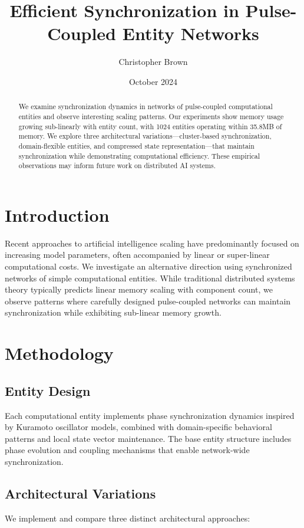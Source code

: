 \documentclass[12pt]{article}
\title{Efficient Synchronization in Pulse-Coupled Entity Networks}
\author{Christopher Brown}
\date{October 2024}
\begin{document}
\maketitle

\begin{abstract}
We examine synchronization dynamics in networks of pulse-coupled computational entities and observe interesting scaling patterns. Our experiments show memory usage growing sub-linearly with entity count, with 1024 entities operating within 35.8MB of memory. We explore three architectural variations—cluster-based synchronization, domain-flexible entities, and compressed state representation—that maintain synchronization while demonstrating computational efficiency. These empirical observations may inform future work on distributed AI systems.
\end{abstract}

\section{Introduction}
Recent approaches to artificial intelligence scaling have predominantly focused on increasing model parameters, often accompanied by linear or super-linear computational costs. We investigate an alternative direction using synchronized networks of simple computational entities. While traditional distributed systems theory typically predicts linear memory scaling with component count, we observe patterns where carefully designed pulse-coupled networks can maintain synchronization while exhibiting sub-linear memory growth.

\section{Methodology}

\subsection{Entity Design}
Each computational entity implements phase synchronization dynamics inspired by Kuramoto oscillator models, combined with domain-specific behavioral patterns and local state vector maintenance. The base entity structure includes phase evolution and coupling mechanisms that enable network-wide synchronization.

\subsection{Architectural Variations}
We implement and compare three distinct architectural approaches:
\end{document}
